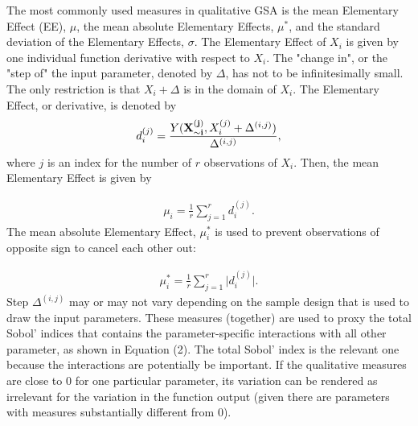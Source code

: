 \documentclass[a4paper,12pt]{article}
\begin{document}
The most commonly used measures in qualitative GSA is the mean Elementary Effect (EE), $\mu$, the mean absolute Elementary Effects, $\mu^*$, and the standard deviation of the Elementary Effects, $\sigma$. The Elementary Effect of $X_i$ is given by one individual function derivative with respect to $X_i$. The "change in", or the "step of" the input parameter, denoted by $\Delta$, has not to be infinitesimally small. The only restriction is that $X_i + \Delta$ is in the domain of $X_i$. The Elementary Effect, or derivative, is denoted by
\begin{align}
d_i^{(j)} =  \frac{Y(\bold{X_{\sim i}^{(j)}}, X_i^{(j)} + \Delta^{(i,j)})}{\Delta^{(i,j)}},
\end{align}
where $j$ is an index for the number of $r$ observations of $X_i$.
Then, the mean Elementary Effect is given by

\begin{align}
\mu_i = \frac{1}{r} \sum_{j=1}^{r} d_i^{(j)}.
\end{align}
\noindent
The mean absolute Elementary Effect, $\mu_i^*$ is used to prevent observations of opposite sign to cancel each other out:

\begin{align}
\mu_i^* = \frac{1}{r} \sum_{j=1}^{r} \big| d_i^{(j)} \big|.
\end{align}
\noindent
Step $\Delta^{(i,j)}$ may or may not vary depending on the sample design that is used to draw the input parameters. These measures (together) are used to proxy the total Sobol' indices that contains the parameter-specific interactions with all other parameter, as shown in Equation (2). The total Sobol' index is the relevant one because the interactions are potentially be important. If the qualitative measures are close to 0 for one particular parameter, its variation can be rendered as irrelevant for the variation in the function output (given there are parameters with measures substantially different from 0).


\newpage

\end{document}
